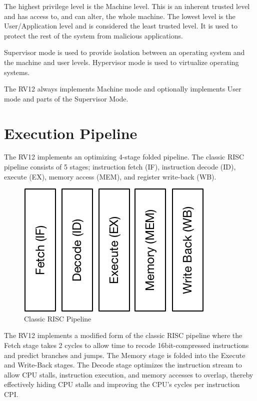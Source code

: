 The highest privilege level is the Machine level.  This is an inherent trusted
level and has access to, and can alter, the whole machine.  The lowest level is
the User/Application level and is considered the least trusted level.  It is
used to protect the rest of the system from malicious applications.

Supervisor mode is used to provide isolation between an operating system and the
machine and user levels.  Hypervisor mode is used to virtualize operating
systems.

The RV12 always implements Machine mode and optionally implements User mode and
parts of the Supervisor Mode.

\section{Execution Pipeline}\label{execution-pipeline}

The RV12 implements an optimizing 4-stage folded pipeline.  The classic RISC
pipeline consists of 5 stages; instruction fetch (IF), instruction decode (ID),
execute (EX), memory access (MEM), and register write-back (WB).

\begin{figure}[hbt]
  \includegraphics{assets/img/Pipeline-Reg}
  \caption{Classic RISC Pipeline}
\end{figure}

The RV12 implements a modified form of the classic RISC pipeline where the Fetch
stage takes 2 cycles to allow time to recode 16bit-compressed instructions and
predict branches and jumps.  The Memory stage is folded into the Execute and
Write-Back stages.  The Decode stage optimizes the instruction stream to allow
CPU stalls, instruction execution, and memory accesses to overlap, thereby
effectively hiding CPU stalls and improving the CPU's cycles per instruction
CPI.

